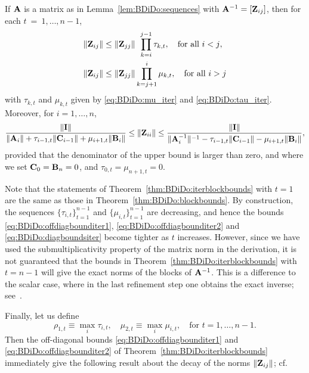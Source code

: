 \begin{thm}\label{thm:BDiDo:iterblockbounds}
If $\mathbf{A}$ is a matrix as in Lemma~\ref{lem:BDiDo:sequences} with
$\mathbf{A}^{-1}=[\mathbf{Z}_{ij}]$,
then for each $t~=~1,\ldots,n-1$,
\begin{align}
\|\mathbf{Z}_{ij}\|&\leq \|\mathbf{Z}_{jj}\| \;\,\prod_{k=i}^{j-1}\tau_{k,t},\quad\text{for all $i<j$},\label{eq:BDiDo:offdiagbounditer1}\\
\|\mathbf{Z}_{ij}\|&\leq \|\mathbf{Z}_{jj}\|\prod_{k=j+1}^{i}\mu_{k,t},\quad\text{for all $i>j$}\label{eq:BDiDo:offdiagbounditer2}
\end{align}
%
with $\tau_{k,t}$ and $\mu_{k,t}$ given by \eqref{eq:BDiDo:mu_iter} and \eqref{eq:BDiDo:tau_iter}. Moreover, for $i=1,\dots,n$,
%
\begin{equation}\label{eq:BDiDo:diagboundsiter}
\frac{\|\mathbf{I}\|}{\|\mathbf{A}_i\|+\tau_{i-1,t}\|\mathbf{C}_{i-1}\|+\mu_{i+1,t}\|\mathbf{B}_{i}\|}
\leq \|\mathbf{Z}_{ii}\|
\leq \frac{\|\mathbf{I}\|}{\|\mathbf{A}_i^{-1}\|^{-1}-\tau_{i-1,t}\|\mathbf{C}_{i-1}\|-\mu_{i+1,t}\|\mathbf{B}_i\|},\nonumber
\end{equation}
provided that the denominator of the upper bound is larger than zero,
and where we set $\mathbf{C}_0=\mathbf{B}_n=0$, and $\tau_{0,t}=\mu_{n+1,t}=0$.
\end{thm}

Note that the statements of Theorem~\ref{thm:BDiDo:iterblockbounds} with $t=1$
are the same as those in Theorem~\ref{thm:BDiDo:blockbounds}. By construction,
the sequences $\{\tau_{i,t}\}_{t=1}^{n-1}$ and $\{\mu_{i,t}\}_{t=1}^{n-1}$ are
decreasing, %
and hence the bounds \eqref{eq:BDiDo:offdiagbounditer1},
\eqref{eq:BDiDo:offdiagbounditer2} and \eqref{eq:BDiDo:diagboundsiter} become
tighter as $t$ increases. However, since we have
used the submultiplicativity property of the matrix norm in the derivation, it
is not guaranteed that the bounds in Theorem~\ref{thm:BDiDo:iterblockbounds}
with $t=n-1$ will give the exact norms of the blocks of $\mathbf{A}^{-1}$. This is a
difference to the scalar case, where in the last refinement step one obtains
the exact inverse; see~\cite{Nabben99}.

Finally, let us define
\begin{equation*}
\rho_{1,t}\equiv\max_i \tau_{i,t},\quad \mu_{2,t}\equiv\max_i \mu_{i,t},\quad
\mbox{for $t=1,\ldots,n-1$.}
\end{equation*}
Then the off-diagonal bounds \eqref{eq:BDiDo:offdiagbounditer1} and
\eqref{eq:BDiDo:offdiagbounditer2} of Theorem~\ref{thm:BDiDo:iterblockbounds}
immediately give the following result about the decay of the norms
$\|\mathbf{Z}_{ij}\|$; cf.~\cite[Corollary~3.7]{Nabben99}

